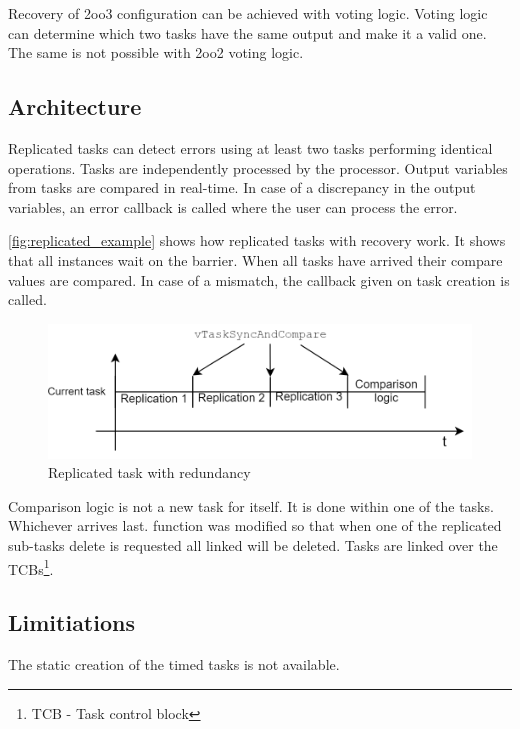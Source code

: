 Recovery of 2oo3 configuration can be achieved with voting logic. Voting logic can determine which two tasks have the same output and make it a valid one. The same is not possible with 2oo2 voting logic.

\subsection{Architecture}

Replicated tasks can detect errors using at least two tasks performing identical operations. Tasks are independently processed by the processor. Output variables from tasks are compared in real-time. In case of a discrepancy in the output variables, an error callback is called where the user can process the error.

\autoref{fig:replicated_example} shows how replicated tasks with recovery work. It shows that all instances wait on the barrier. When all tasks have arrived their compare values are compared. In case of a mismatch, the callback given on task creation is called. 


\begin{figure}[H]

      \centering
      \includegraphics[width=\linewidth]{images/replicated_example.png}
      \caption{Replicated task with redundancy}
      \label{fig:replicated_example}
    
\end{figure}

Comparison logic is not a new task for itself. It is done within one of the tasks. Whichever arrives last.  function was modified so that when one of the replicated sub-tasks delete is requested all linked will be deleted. Tasks are linked over the TCBs\footnote{TCB - Task control block}.

\subsection{Limitiations}

The static creation of the timed tasks is not available.

